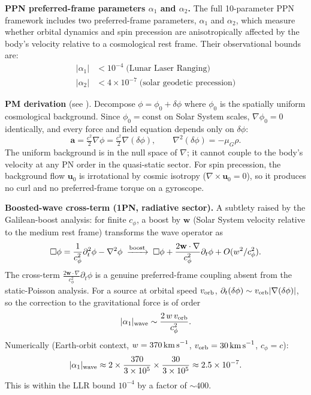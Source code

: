 \documentclass[10pt,twocolumn]{article}
\begin{document}
\textbf{PPN preferred-frame parameters $\alpha_1$ and $\alpha_2$.}
The full 10-parameter PPN framework includes two preferred-frame parameters,
$\alpha_1$ and $\alpha_2$, which measure whether orbital dynamics and spin
precession are anisotropically affected by the body's velocity relative to a
cosmological rest frame.  Their observational bounds are:
\begin{align*}
  |\alpha_1| &< 10^{-4} \;\text{(Lunar Laser Ranging)} \\
  |\alpha_2| &< 4\times 10^{-7} \;\text{(solar geodetic precession)}
\end{align*}

\textbf{PM derivation} (see ).
Decompose $\phi = \phi_0 + \delta\phi$ where $\phi_0$ is the spatially
uniform cosmological background.  Since $\phi_0=\text{const}$ on Solar System
scales, $\nabla\phi_0=0$ identically, and every force and field equation
depends only on $\delta\phi$:
\[
  \mathbf{a} = \tfrac{c^2}{2}\nabla\phi = \tfrac{c^2}{2}\nabla(\delta\phi),
  \qquad
  \nabla^2(\delta\phi) = -\mu_G\rho.
\]
The uniform background is in the null space of $\nabla$; it cannot couple to
the body's velocity at any PN order in the quasi-static sector.  For spin
precession, the background flow $\mathbf{u}_0$ is irrotational by cosmic
isotropy ($\nabla\times\mathbf{u}_0=0$), so it produces no curl and no
preferred-frame torque on a gyroscope.

\textbf{Boosted-wave cross-term (1PN, radiative sector).}
A subtlety raised by the Galilean-boost analysis: for finite $c_\phi$, a
boost by $\mathbf{w}$ (Solar System velocity relative to the medium rest frame)
transforms the wave operator as
\[
  \Box\phi
  = \frac{1}{c_\phi^2}\partial_t^2\phi - \nabla^2\phi
  \;\xrightarrow{\rm boost}\;
  \Box\phi + \frac{2\mathbf{w}\cdot\nabla}{c_\phi^2}\partial_t\phi + O(w^2/c_\phi^2).
\]
The cross-term $\frac{2\mathbf{w}\cdot\nabla}{c_\phi^2}\partial_t\phi$ is a
genuine preferred-frame coupling absent from the static-Poisson analysis.
For a source at orbital speed $v_{\rm orb}$, $\partial_t(\delta\phi)\sim
v_{\rm orb}|\nabla(\delta\phi)|$, so the correction to the gravitational force
is of order
\[
  |\alpha_1|_{\rm wave} \sim \frac{2\,w\,v_{\rm orb}}{c_\phi^2}.
\]
Numerically (Earth-orbit context, $w=370\,{\rm km\,s}^{-1}$,
$v_{\rm orb}=30\,{\rm km\,s}^{-1}$, $c_\phi = c$):
\[
  |\alpha_1|_{\rm wave}
  \approx 2\times\frac{370}{3\times10^5}\times\frac{30}{3\times10^5}
  \approx 2.5\times10^{-7}.
\]
This is within the LLR bound $10^{-4}$ by a factor of $\sim\!400$.
\end{document}
